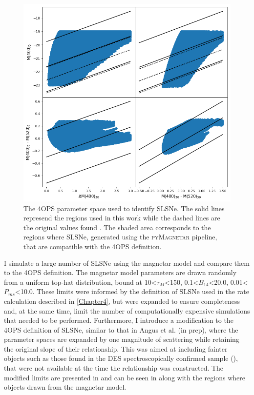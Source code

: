 \begin{figure}
  \includegraphics[width=\textwidth]{Figures/Chapter5/4ops.png}
  \caption{The 4OPS parameter space used to identify SLSNe. The solid lines represend the regions used in this work while the dashed lines are the original values found \citet{Inserra2018a}. The shaded area corresponds to the regions where SLSNe, generated using the \textsc{pyMagnetar} pipeline, that are compatible with the 4OPS definition.}
  \label{fig:4OPS}
\end{figure}

I simulate a large number of SLSNe using the magnetar model and compare them to the 4OPS definition. The magnetar model parameters are drawn randomly from a uniform top-hat distribution, bound at 10<$\tau_M$<150, 0.1<$B_{14}$<20.0, 0.01<$P_{ms}$<10.0. These limits were informed by the definition of SLSNe used in the rate calculation described in \cref{Chapter4}, but were expanded to ensure completeness and, at the same time, limit the number of computationally expensive simulations that needed to be performed. Furthermore, I introduce a modification to the 4OPS definition of SLSNe, similar to that in Angus et al. (in prep), where the parameter spaces are expanded by one magnitude of scattering while retaining the original slope of their relationship. This was aimed at including fainter objects such as those found in the DES spectroscopically confirmed sample (), that were not available at the time the relationship was constructed. The modified limits are presented in  and can be seen in  along with the regions where objects drawn from the magnetar model.

